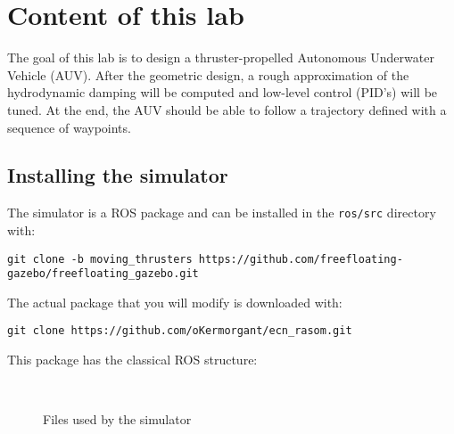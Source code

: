 \documentclass{ecnreport}
\begin{document}




\section{Content of this lab}

The goal of this lab is to design a thruster-propelled Autonomous Underwater Vehicle (AUV). After the geometric design, a rough approximation of the hydrodynamic damping will be computed
and low-level control (PID's) will be tuned. At the end, the AUV should be able to follow a trajectory defined with a sequence of waypoints.

\subsection{Installing the simulator}

The simulator is a ROS package and can be installed in the \texttt{ros/src} directory with:
\begin{center}
\begin{lstlisting}
git clone -b moving_thrusters https://github.com/freefloating-gazebo/freefloating_gazebo.git
\end{lstlisting}
\end{center}

The actual package that you will modify is downloaded with:
\begin{center}
\begin{lstlisting}
git clone https://github.com/oKermorgant/ecn_rasom.git
\end{lstlisting}
\end{center}
This package has the classical ROS structure:
\begin{figure}[h]
\begin{minipage}{.25\linewidth} ~ \end{minipage}
\begin{minipage}{.5\linewidth}
\end{minipage}
\caption{Files used by the simulator}
\end{figure}
\end{document}

